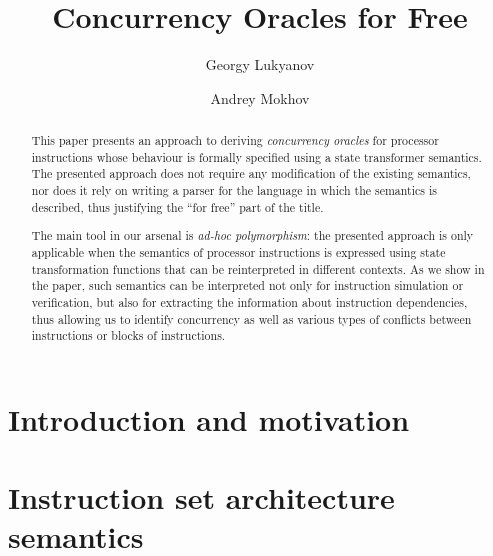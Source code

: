 \documentclass{llncs}
\begin{document}
%
\title{Concurrency Oracles for Free}

%
\author{Georgy Lukyanov \and Andrey Mokhov}
%
%

\maketitle

\begin{abstract}
This paper presents an approach to deriving \emph{concurrency oracles} for
processor instructions whose behaviour is formally specified using a state
transformer semantics. The presented approach does not require any modification
of the existing semantics, nor does it rely on writing a parser for the language
in which the semantics is described, thus justifying the ``for free'' part of
the title.

The main tool in our arsenal is \emph{ad-hoc polymorphism}: the presented
approach is only applicable when the semantics of processor instructions is
expressed using state transformation functions that can be reinterpreted in
different contexts. As we show in the paper, such semantics can be interpreted
not only for instruction simulation or verification, but also for extracting the
information about instruction dependencies, thus allowing us to identify
concurrency as well as various types of conflicts between instructions or blocks
of instructions.

\end{abstract}

\section{Introduction and motivation\label{sec:intro}}


\vspace{-1mm}
\section{Instruction set architecture semantics\label{sec:instructions}}
\vspace{-2mm}

\end{document}

